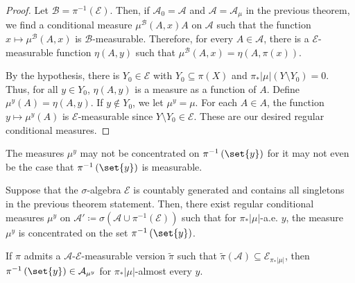 \documentclass[10pt]{mypackage}
\renewcommand{\coloneq}{\coloneqq}
\begin{document}
\begin{proof}
  Let $\mathcal{B} = \pi^{-1}\left( \mathcal{E} \right)$. Then, if $\mathcal{A}_0 = \mathcal{A}$ and $\mathcal{A} = \mathcal{A}_{\mu}$ in the previous theorem, we find a conditional measure $\mu^{\mathcal{B}}\left( A,x \right)A$ on $\mathcal{A}$ such that the function $x\mapsto \mu^{\mathcal{B}}\left( A,x \right)$ is $\mathcal{B}$-measurable. Therefore, for every $A\in \mathcal{A}$, there is a $\mathcal{E}$-measurable function $\eta\left( A,y \right)$ such that $\mu^{\mathcal{B}}\left( A,x \right) = \eta\left( A,\pi(x) \right)$.

  By the hypothesis, there is $Y_0\in \mathcal{E}$ with $Y_0\subseteq \pi(X)$ and $\pi_{\ast}\left\vert \mu \right\vert\left( Y\setminus Y_0 \right) = 0$. Thus, for all $y\in Y_0$, $\eta\left( A,y \right)$ is a measure as a function of $A$. Define $\mu^y(A) = \eta\left( A,y \right)$. If $y\notin Y_0$, we let $\mu^y = \mu$. For each $A\in A$, the function $y\mapsto \mu^y(A)$ is $\mathcal{E}$-measurable since $Y\setminus Y_0\in \mathcal{E}$. These are our desired regular conditional measures.
\end{proof}
The measures $\mu^y$ may not be concentrated on $\pi^{-1}\left( \set{y} \right)$ for it may not even be the case that $\pi^{-1}\left( \set{y} \right)$ is measurable.
\begin{corollary}
  Suppose that the $\sigma$-algebra $\mathcal{E}$ is countably generated and contains all singletons in the previous theorem statement. Then, there exist regular conditional measures $\mu^y$ on $\mathcal{A}'\coloneq \sigma\left( \mathcal{A}\cup \pi^{-1}\left( \mathcal{E} \right) \right)$ such that for $\pi_{\ast}\left\vert \mu \right\vert$-a.e. $y$, the measure $\mu^y$ is concentrated on the set $\pi^{-1}\left( \set{y} \right)$. 

  If $\pi$ admits a $\mathcal{A}$-$\mathcal{E}$-measurable version $ \widetilde{\pi} $ such that $ \widetilde{\pi}\left( \mathcal{A} \right)\subseteq \mathcal{E}_{\pi_{\ast}\left\vert \mu \right\vert} $, then $\pi^{-1}\left( \set{y} \right)\in \mathcal{A}_{\mu^y}$ for $\pi_{\ast}\left\vert \mu \right\vert$-almost every $y$.
\end{corollary}
\end{document}
